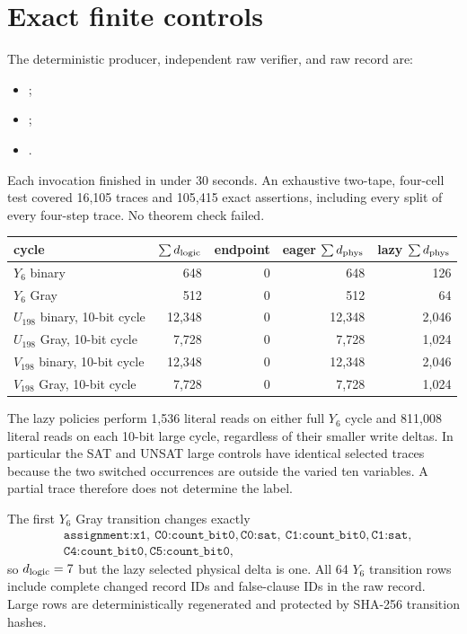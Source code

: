 \documentclass[11pt]{article}
\begin{document}
\section{Exact finite controls}
The deterministic producer, independent raw verifier, and raw record are:
\begin{itemize}
\item {};
\item {};
\item {}.
\end{itemize}
Each invocation finished in under 30 seconds.  An exhaustive two-tape,
four-cell test covered 16,105 traces and 105,415 exact assertions, including
every split of every four-step trace.  No theorem check failed.

\begin{center}
\begin{tabular}{lrrrr}
\toprule
cycle & $\sum d_{\rm logic}$ & endpoint & eager $\sum d_{\rm phys}$ & lazy $\sum d_{\rm phys}$\\
\midrule
$Y_6$ binary & 648 & 0 & 648 & 126\\
$Y_6$ Gray & 512 & 0 & 512 & 64\\
$U_{198}$ binary, 10-bit cycle & 12,348 & 0 & 12,348 & 2,046\\
$U_{198}$ Gray, 10-bit cycle & 7,728 & 0 & 7,728 & 1,024\\
$V_{198}$ binary, 10-bit cycle & 12,348 & 0 & 12,348 & 2,046\\
$V_{198}$ Gray, 10-bit cycle & 7,728 & 0 & 7,728 & 1,024\\
\bottomrule
\end{tabular}
\end{center}
The lazy policies perform 1,536 literal reads on either full $Y_6$ cycle and
811,008 literal reads on each 10-bit large cycle, regardless of their smaller
write deltas.  In particular the SAT and UNSAT large controls have identical
selected traces because the two switched occurrences are outside the varied
ten variables.  A partial trace therefore does not determine the label.

The first $Y_6$ Gray transition changes exactly
\[
\begin{split}
&\texttt{assignment:x1},\ 
\texttt{C0:count\_bit0},\texttt{C0:sat},\
\texttt{C1:count\_bit0},\texttt{C1:sat},\\
&\texttt{C4:count\_bit0},\texttt{C5:count\_bit0},
\end{split}
\]
so $d_{\rm logic}=7$ but the lazy selected physical delta is one.  All 64
$Y_6$ transition rows include complete changed record IDs and false-clause IDs
in the raw record.  Large rows are deterministically regenerated and protected
by SHA-256 transition hashes.
\end{document}
